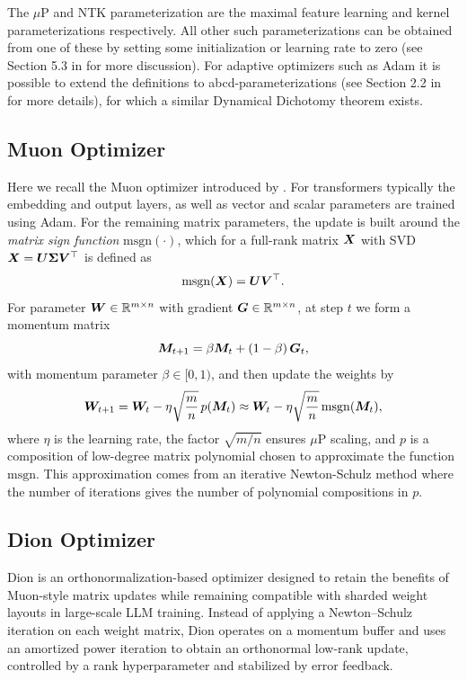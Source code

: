 \documentclass{article} %
\renewcommand{\citet}[1]{\cite{#1}}
\renewcommand{\citep}[1]{\cite{#1}}
\begin{document}
 The $\mu$P and NTK parameterization are the maximal feature learning and kernel parameterizations respectively. All other such parameterizations can be obtained from one of these by setting some initialization or learning rate to zero (see Section 5.3 in \citep{yang2021tensor} for more discussion). For adaptive optimizers such as Adam it is possible to extend the definitions to abcd-parameterizations (see Section 2.2 in \citep{yang2023tensor} for more details), for which a similar Dynamical Dichotomy theorem exists.

\subsection{Muon Optimizer}\label{app:muon}
Here we recall the Muon optimizer introduced by \citet{jordan2024muon}. For transformers typically the embedding and output layers, as well as vector and scalar parameters are trained using Adam. For the remaining matrix parameters, the update is built around the \emph{matrix sign function} $\mathrm{msgn}(\cdot)$, which for a full-rank matrix ${\boldsymbol X}$ with SVD ${\boldsymbol X} = {\boldsymbol U} {\boldsymbol \Sigma} {\boldsymbol V}^\top$ is defined as
\[
  \mathrm{msgn}({\boldsymbol X}) = {\boldsymbol U} {\boldsymbol V}^\top.
\]
For parameter ${\boldsymbol W} \in \mathbb{R}^{m \times n}$ with gradient ${\boldsymbol G} \in \mathbb{R}^{m \times n}$, at step $t$ we form a momentum matrix
\[
  {\boldsymbol M}_{t+1} = \beta {\boldsymbol M}_t + (1 - \beta)\, {\boldsymbol G}_t,
\]
with momentum parameter $\beta \in [0,1)$, and then update the weights by
\[
  {\boldsymbol W}_{t+1} = {\boldsymbol W}_t - \eta \sqrt{\frac{m}{n}}\, p({\boldsymbol M}_{t}) \approx {\boldsymbol W}_t - \eta \sqrt{\frac{m}{n}}\, \mathrm{msgn}({\boldsymbol M}_{t}),
\]
where $\eta$ is the learning rate, the factor $\sqrt{m/n}$ ensures $\mu$P scaling, and $p$ is a composition of low-degree matrix polynomial chosen to approximate the function $\mathrm{msgn}$. This approximation comes from an iterative Newton-Schulz method where the number of iterations gives the number of polynomial compositions in $p$. 

\subsection{Dion Optimizer}\label{app:dion}
Dion \citep{ahn2025dion} is an orthonormalization-based optimizer designed to retain the benefits of Muon-style matrix updates while remaining compatible with sharded weight layouts in large-scale LLM training. Instead of applying a Newton--Schulz iteration on each weight matrix, Dion operates on a momentum buffer and uses an amortized power iteration to obtain an orthonormal low-rank update, controlled by a rank hyperparameter and stabilized by error feedback.
\end{document}

